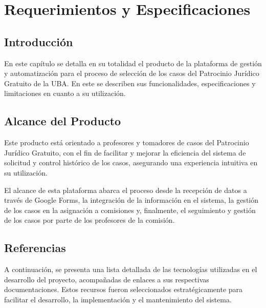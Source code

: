 \chapter{Requerimientos y Especificaciones}\label{cap:disenio}

\section{Introducción}
En este capítulo se detalla en su totalidad el producto de la plataforma de gestión y automatización para el proceso de selección de los casos del Patrocinio Jurídico Gratuito de la UBA. En este se describen sus funcionalidades, especificaciones y limitaciones en cuanto a su utilización.

\section{Alcance del Producto}
Este producto está orientado a profesores y tomadores de casos del Patrocinio Jurídico Gratuito, con el fin de facilitar y mejorar la eficiencia del sistema de solicitud y control histórico de los casos, asegurando una experiencia intuitiva en su utilización.

El alcance de esta plataforma abarca el proceso desde la recepción de datos a través de Google Forms, la integración de la información en el sistema, la gestión de los casos en la asignación a comisiones y, finalmente, el seguimiento y gestión de los casos por parte de los profesores de la comisión. 

\section{Referencias}
A continuación, se presenta una lista detallada de las tecnologías utilizadas en el desarrollo del proyecto, acompañadas de enlaces a sus respectivas documentaciones. Estos recursos fueron seleccionados estratégicamente para facilitar el desarrollo, la implementación y el mantenimiento del sistema.


